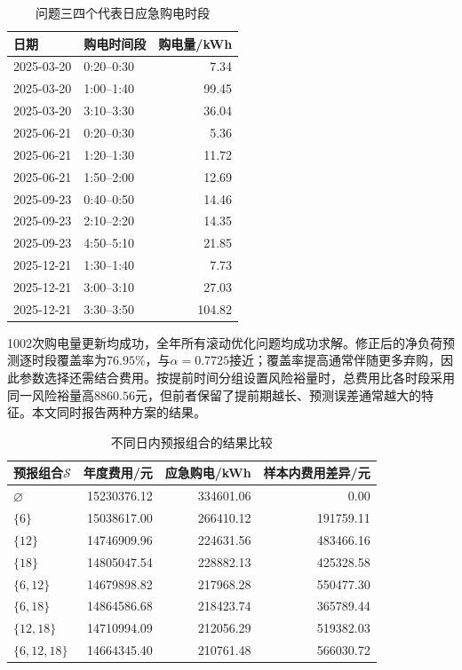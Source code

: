 \documentclass[UTF8,12pt,a4paper]{ctexart}
\theoremstyle{remark}
\begin{document}
\begin{table}[H]\centering\scriptsize
\caption{问题三四个代表日应急购电时段}\label{tab:q3-emergency}
\begin{tabular}{llr}\toprule 日期&购电时间段&购电量/kWh\\\midrule
2025-03-20&0:20--0:30&7.34\\
2025-03-20&1:00--1:40&99.45\\
2025-03-20&3:10--3:30&36.04\\
2025-06-21&0:20--0:30&5.36\\
2025-06-21&1:20--1:30&11.72\\
2025-06-21&1:50--2:00&12.69\\
2025-09-23&0:40--0:50&14.46\\
2025-09-23&2:10--2:20&14.35\\
2025-09-23&4:50--5:10&21.85\\
2025-12-21&1:30--1:40&7.73\\
2025-12-21&3:00--3:10&27.03\\
2025-12-21&3:30--3:50&104.82\\\bottomrule\end{tabular}\end{table}

1002次购电量更新均成功，全年所有滚动优化问题均成功求解。修正后的净负荷预测逐时段覆盖率为$76.95\%$，与$\alpha=0.7725$接近；覆盖率提高通常伴随更多弃购，因此参数选择还需结合费用。按提前时间分组设置风险裕量时，总费用比各时段采用同一风险裕量高$8860.56$元，但前者保留了提前期越长、预测误差通常越大的特征。本文同时报告两种方案的结果。

\begin{table}[H]\centering\small
\caption{不同日内预报组合的结果比较}\label{tab:q3-ablation}
\begin{tabular}{lrrr}\toprule
预报组合$\mathcal S$&年度费用/元&应急购电/kWh&样本内费用差异/元\\\midrule
$\varnothing$&15230376.12&334601.06&0.00\\
$\{6\}$&15038617.00&266410.12&191759.11\\
$\{12\}$&14746909.96&224631.56&483466.16\\
$\{18\}$&14805047.54&228882.13&425328.58\\
$\{6,12\}$&14679898.82&217968.28&550477.30\\
$\{6,18\}$&14864586.68&218423.74&365789.44\\
$\{12,18\}$&14710994.09&212056.29&519382.03\\
$\{6,12,18\}$&14664345.40&210761.48&566030.72\\\bottomrule
\end{tabular}
\end{table}
\end{document}
